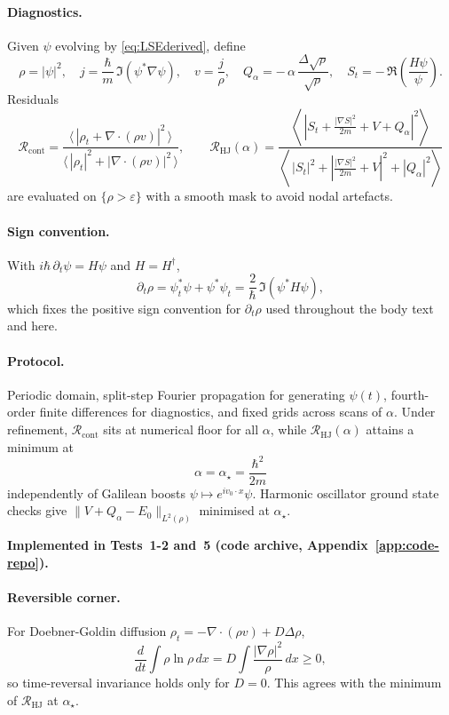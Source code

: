\documentclass[11pt,a4paper]{article}
\numberwithin{equation}{section}
\theoremstyle{thmcompact}
\theoremstyle{remark}
\begin{document}
\paragraph{Diagnostics.}
Given $\psi$ evolving by \eqref{eq:LSEderived}, define
\[
\rho=|\psi|^2,\quad
j=\frac{\hbar}{m}\,\Im(\psi^*\nabla\psi),\quad
v=\frac{j}{\rho},\quad
Q_\alpha=-\,\alpha\,\frac{\Delta\sqrt{\rho}}{\sqrt{\rho}},\quad
S_t=-\,\Re\!\left(\frac{H\psi}{\psi}\right).
\]
Residuals
\[
\mathcal{R}_{\mathrm{cont}}
=\frac{\langle\,|\rho_t+\nabla\!\cdot(\rho v)|^2\,\rangle}
{\langle\,|\rho_t|^2+|\nabla\!\cdot(\rho v)|^2\,\rangle},\qquad
\mathcal{R}_{\mathrm{HJ}}(\alpha)
=\frac{\left\langle\,\left|S_t+\frac{|\nabla S|^2}{2m}+V+Q_\alpha\right|^2\right\rangle}
{\left\langle\,|S_t|^2+\left|\frac{|\nabla S|^2}{2m}+V\right|^2+|Q_\alpha|^2\right\rangle}
\]
are evaluated on $\{\rho>\varepsilon\}$ with a smooth mask to avoid nodal artefacts.

\paragraph{Sign convention.}
With $i\hbar\,\partial_t\psi=H\psi$ and $H=H^\dagger$,
\[
\partial_t\rho
=\psi_t^*\psi+\psi^*\psi_t
=\frac{2}{\hbar}\,\Im(\psi^*H\psi),
\]
which fixes the positive sign convention for $\partial_t\rho$ used throughout the body text and here.


\paragraph{Protocol.}
Periodic domain, split-step Fourier propagation for generating $\psi(t)$, fourth-order finite differences for diagnostics, and fixed grids across scans of $\alpha$.
Under refinement, $\mathcal{R}_{\mathrm{cont}}$ sits at numerical floor for all $\alpha$, while $\mathcal{R}_{\mathrm{HJ}}(\alpha)$ attains a minimum at
\[
\boxed{\ \alpha=\alpha_\star=\frac{\hbar^2}{2m}\ }
\]
independently of Galilean boosts $\psi\mapsto e^{iv_0\cdot x}\psi$.
Harmonic oscillator ground state checks give
$\|V+Q_\alpha-E_0\|_{L^2(\rho)}$ minimised at $\alpha_\star$.

\textbf{Implemented in Tests~1-2 and~5 (code archive, Appendix~\ref{app:code-repo}).}

\paragraph{Reversible corner.}
For Doebner-Goldin diffusion $\rho_t=-\nabla\!\cdot(\rho v)+D\Delta\rho$,
\[
\frac{d}{dt}\int \rho\ln\rho\,dx
= D\int \frac{|\nabla\rho|^2}{\rho}\,dx \ge 0,
\]
so time-reversal invariance holds only for $D=0$.
This agrees with the minimum of $\mathcal{R}_{\mathrm{HJ}}$ at $\alpha_\star$.
\end{document}
